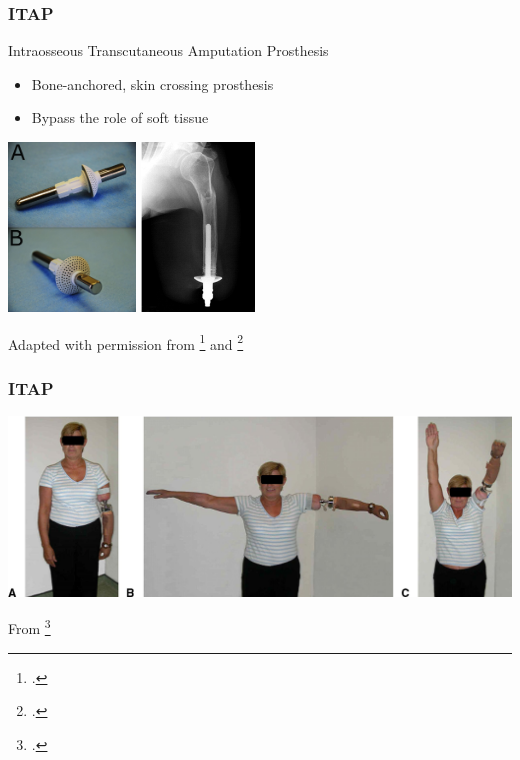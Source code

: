 \begin{frame}
    \frametitle{ITAP}
    Intraosseous Transcutaneous Amputation Prosthesis
\begin{itemize}
    \item Bone-anchored, skin crossing prosthesis
    \item Bypass the role of soft tissue
\end{itemize}
        \includegraphics[height=4.5cm]{figures/ITAP-old.jpg}
        \includegraphics[height=4.5cm]{figures/ITAP-xray.jpg}
        {\tiny {}}

        {\tiny Adapted with permission from \footcite{Fitzpatrick2011ITAP} and \footcite{KANG20101130} }

\end{frame}

\begin{frame}
    \frametitle{ITAP}

    \includegraphics[width=1\textwidth]{figures/itap-prosthesis.jpg}

    {\tiny From \footcite{KANG20101130}}

\end{frame}

